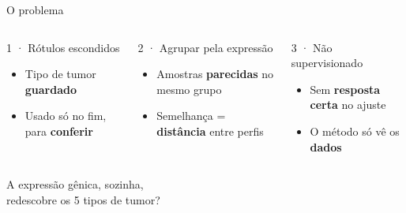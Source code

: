 \documentclass[aspectratio=169,10pt,xcolor=table]{beamer}
\begin{document}
\begin{frame}{O problema}
  \vspace{0.35cm}
  \begin{columns}[T,onlytextwidth]
    \begin{card}[height=2.7cm,fontupper=\normalsize]{1 · Rótulos escondidos}
      \begin{itemize}
        \item Tipo de tumor \textbf{guardado}
        \item Usado só no fim, para \textbf{conferir}
      \end{itemize}
    \end{card}
    \begin{card}[height=2.7cm,fontupper=\normalsize]{2 · Agrupar pela expressão}
      \begin{itemize}
        \item Amostras \textbf{parecidas} no mesmo grupo
        \item Semelhança = \textbf{distância} entre perfis
      \end{itemize}
    \end{card}
    \begin{card}[height=2.7cm,fontupper=\normalsize,colbacktitle=accent]{3 · Não supervisionado}
      \begin{itemize}
        \item Sem \textbf{resposta certa} no ajuste
        \item O método só vê os \textbf{dados}
      \end{itemize}
    \end{card}
  \end{columns}
  \vspace{0.45cm}
  \begin{banner}
    \Large A expressão gênica, sozinha,\\ redescobre os 5 tipos de tumor?
  \end{banner}
\end{frame}
\end{document}
